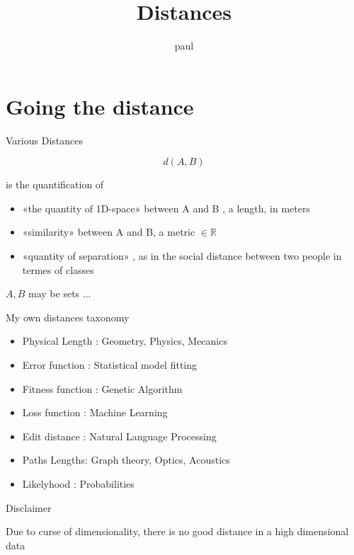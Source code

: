 \documentclass{beamer}
\title{Distances}
\subtitle{}
\date{}
\author{paul}
\begin{document}
\maketitle  

\section{Going the distance} 

\begin{frame}{Various Distances}


$$d(A,B)$$


is the quantification of 

\begin{itemize}
\item   «the quantity of 1D-space» between A and B , a \alert{length}, in meters
\item «similarity» between A and B, a \alert{metric} $\in \mathbb{R}$
\item  «quantity of separation» , as in the \alert{social distance} between two people in termes of classes  
\end{itemize}


$A,B$ may be sets ...

\end{frame}


\begin{frame}{My own distances taxonomy}



\begin{itemize}
\item  Physical Length : Geometry, Physics, Mecanics
\item  Error function :  Statistical model fitting 
\item  Fitness function : Genetic Algorithm
\item  Loss function : Machine Learning
\item  Edit distance : Natural Language Processing
\item  Paths Lengths:  Graph theory, Optics, Acoustics
\item  Likelyhood : Probabilities 
\end{itemize}


\end{frame}



\begin{frame}{Disclaimer}


Due to \alert{curse of dimensionality}, there is no good distance in a high dimensional data
\end{frame}
\end{document}
